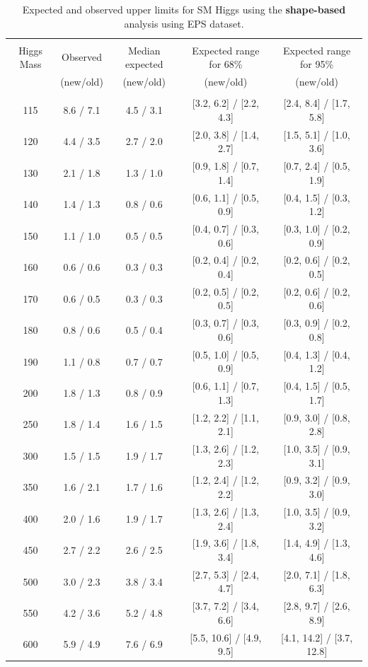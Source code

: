 \begin{table}[hbp!]
\begin{center}
\begin{tabular}{c c c c c}
\hline
\vspace{-3mm} && \\
 Higgs Mass   & Observed & Median expected & Expected range for 68\% & Expected range for 95\%   \\
  & (new/old) & (new/old) & (new/old) & (new/old)   \\
\vspace{-3mm} && \\
\hline
115 & 8.6 / 7.1 & 4.5 / 3.1 & [3.2, 6.2] / [2.2, 4.3]& [2.4, 8.4] / [1.7, 5.8] \\
120 & 4.4 / 3.5 & 2.7 / 2.0 & [2.0, 3.8] / [1.4, 2.7]& [1.5, 5.1] / [1.0, 3.6] \\
130 & 2.1 / 1.8 & 1.3 / 1.0 & [0.9, 1.8] / [0.7, 1.4]& [0.7, 2.4] / [0.5, 1.9] \\
140 & 1.4 / 1.3 & 0.8 / 0.6 & [0.6, 1.1] / [0.5, 0.9]& [0.4, 1.5] / [0.3, 1.2] \\
150 & 1.1 / 1.0 & 0.5 / 0.5 & [0.4, 0.7] / [0.3, 0.6]& [0.3, 1.0] / [0.2, 0.9] \\
160 & 0.6 / 0.6 & 0.3 / 0.3 & [0.2, 0.4] / [0.2, 0.4]& [0.2, 0.6] / [0.2, 0.5] \\
170 & 0.6 / 0.5 & 0.3 / 0.3 & [0.2, 0.5] / [0.2, 0.5]& [0.2, 0.6] / [0.2, 0.6] \\
180 & 0.8 / 0.6 & 0.5 / 0.4 & [0.3, 0.7] / [0.3, 0.6]& [0.3, 0.9] / [0.2, 0.8] \\
190 & 1.1 / 0.8 & 0.7 / 0.7 & [0.5, 1.0] / [0.5, 0.9]& [0.4, 1.3] / [0.4, 1.2] \\
200 & 1.8 / 1.3 & 0.8 / 0.9 & [0.6, 1.1] / [0.7, 1.3]& [0.4, 1.5] / [0.5, 1.7] \\
250 & 1.8 / 1.4 & 1.6 / 1.5 & [1.2, 2.2] / [1.1, 2.1]& [0.9, 3.0] / [0.8, 2.8] \\
300 & 1.5 / 1.5 & 1.9 / 1.7 & [1.3, 2.6] / [1.2, 2.3]& [1.0, 3.5] / [0.9, 3.1] \\
350 & 1.6 / 2.1 & 1.7 / 1.6 & [1.2, 2.4] / [1.2, 2.2]& [0.9, 3.2] / [0.9, 3.0] \\
400 & 2.0 / 1.6 & 1.9 / 1.7 & [1.3, 2.6] / [1.3, 2.4]& [1.0, 3.5] / [0.9, 3.2] \\
450 & 2.7 / 2.2 & 2.6 / 2.5 & [1.9, 3.6] / [1.8, 3.4]& [1.4, 4.9] / [1.3, 4.6] \\
500 & 3.0 / 2.3 & 3.8 / 3.4 & [2.7, 5.3] / [2.4, 4.7]& [2.0, 7.1] / [1.8, 6.3] \\
550 & 4.2 / 3.6 & 5.2 / 4.8 & [3.7, 7.2] / [3.4, 6.6]& [2.8, 9.7] / [2.6, 8.9] \\
600 & 5.9 / 4.9 & 7.6 / 6.9 & [5.5, 10.6] / [4.9, 9.5]& [4.1, 14.2] / [3.7, 12.8]\\
\hline
\end{tabular}
\caption{Expected and observed upper limits for SM Higgs using the
  {\bf shape-based} analysis using EPS dataset.}
\label{tab:mvabase_uls_eps}
\end{center}
\end{table}

